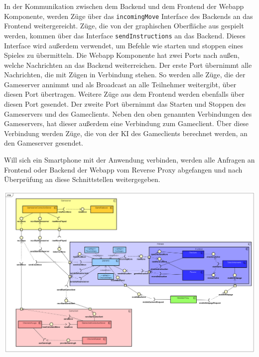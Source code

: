 \documentclass[12pt,a4paper,bibliography=totocnumbered,listof=totocnumbered]{article}
\begin{document}
In der Kommunikation zwischen dem Backend und dem Frontend der Webapp Komponente, werden Züge über das \texttt{incomingMove} Interface des Backends an das Frontend
weitergereicht. Züge, die von der graphischen Oberfläche aus gespielt werden, kommen über das Interface \texttt{sendInstructions} an das Backend. Dieses
Interface wird außerdem verwendet, um Befehle wie starten und stoppen eines Spieles zu übermitteln. Die Webapp Komponente hat zwei Ports nach außen, 
welche Nachrichten an das Backend
weiterreichen. Der erste Port übernimmt alle Nachrichten, die mit Zügen in Verbindung stehen. So werden alle Züge, die der Gameserver annimmt
und als Broadcast an alle Teilnehmer weitergibt, über diesen Port übertragen. Weitere Züge aus dem Frontend werden ebenfalls über diesen Port gesendet.
Der zweite Port übernimmt das Starten und Stoppen des Gameservers und des Gameclients. 
Neben den oben genannten Verbindungen des Gameservers, hat dieser außerdem eine Verbindung zum Gameclient. Über diese Verbindung werden Züge, die von der 
\ac{KI} des Gameclients berechnet werden, an den Gameserver gesendet.

Will sich ein Smartphone mit der Anwendung verbinden, werden alle Anfragen an Frontend oder Backend der Webapp vom Reverse Proxy abgefangen und 
nach Überprüfung an diese Schnittstellen weitergegeben.


\vspace{1em}
\begin{minipage}{\linewidth}
	\centering
	\includegraphics[width=1.0\linewidth]{pics/Komponentendiagram.png}
	\label{fig:ComponentDiagram}
\end{minipage}
\end{document}
